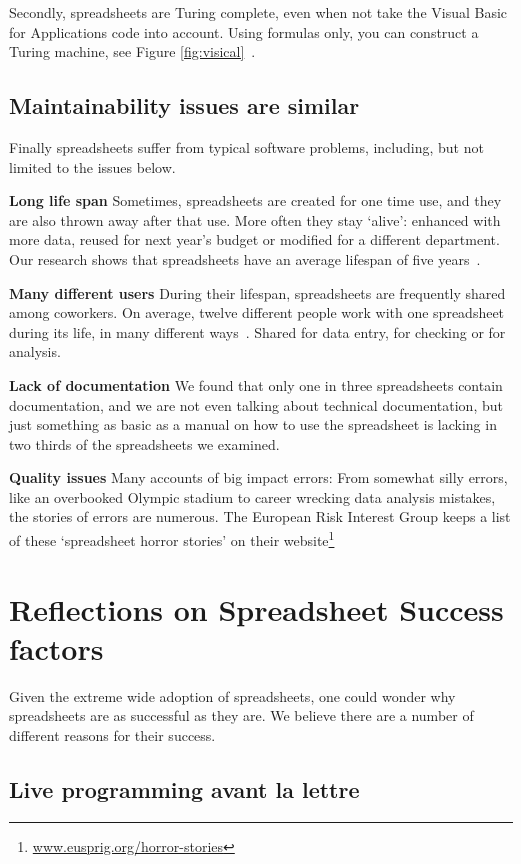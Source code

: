 \documentclass[conference]{IEEEtran}
\begin{document}
Secondly, spreadsheets are Turing complete, even when not take the Visual Basic for Applications code into account. Using formulas only, you can construct a Turing machine, see Figure \ref{fig:visical}~\cite{Turing2013}. 

\subsection{Maintainability issues are similar}

Finally spreadsheets suffer from typical software problems, including, but not limited to the issues below.

\textbf{Long life span} Sometimes, spreadsheets are created for one time use, and they are also thrown away after that use. More often they stay ‘alive’: enhanced with more data, reused for next year's budget or modified for a different department. Our research shows that spreadsheets have an average lifespan of five years~\cite{Hermans2011}.

\textbf{Many different users} During their lifespan, spreadsheets are frequently shared among coworkers. On average, twelve different people work with one spreadsheet during its life, in many different ways~\cite{Hermans2011}. Shared for data entry, for checking or for analysis.

\textbf{Lack of documentation} We found that only one in three spreadsheets  contain documentation, and we are not even talking about technical documentation, but just something as basic as a manual on how to use the spreadsheet is lacking in two thirds of the spreadsheets we examined.

\textbf{Quality issues} Many accounts of big impact errors: From somewhat silly errors, like an overbooked Olympic stadium to career wrecking data analysis mistakes, the stories of errors are numerous. The European Risk Interest Group keeps a list of these ‘spreadsheet horror stories’ on their website\footnote{\url{www.eusprig.org/horror-stories}}

\section{Reflections on Spreadsheet Success factors}
Given the extreme wide adoption of spreadsheets, one could wonder why spreadsheets are as successful as they are. We believe there are a number of different reasons for their success.

\subsection{Live programming avant la lettre}
\end{document}
